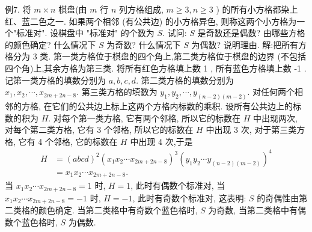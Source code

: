 例7. 将 $m \times n$ 棋盘(由 $m$ 行 $n$ 列方格组成, $m \geqslant 3, n \geqslant 3$ ) 的所有小方格都染上红、蓝二色之一.
如果两个相邻 (有公共边) 的小方格异色, 则称这两个小方格为一个"标准对". 设棋盘中 "标准对" 的个数为 $S$. 试问: $S$ 是奇数还是偶数? 由哪些方格的颜色确定? 什么情况下 $S$ 为奇数? 什么情况下 $S$ 为偶数? 说明理由.
解:把所有方格分为 3 类.
第一类方格位于棋盘的四个角上,第二类方格位于棋盘的边界 (不包括四个角)上,其余方格为第三类.
将所有红色方格填上数 1 , 所有蓝色方格填上数 -1 . 记第一类方格的填数分别为 $a, b, c, d$. 第二类方格的填数分别为 $x_1, x_2, \cdots, x_{2 m+2 n-8}$. 第三类方格的填数为 $y_1, y_2, \cdots, y_{(n-2)(m-2)}$. 对任何两个相邻的方格, 在它们的公共边上标上这两个方格内标数的乘积.
设所有公共边上的标数的积为 $H$.
对每个第一类方格, 它有两个邻格, 所以它的标数在 $H$ 中出现两次, 对每个第二类方格, 它有 3 个邻格, 所以它的标数在 $H$ 中出现 3 次, 对于第三类方格, 它有 4 个邻格, 它的标数在 $H$ 中出现 4 次,于是
$$
\begin{aligned}
H & =(a b c d)^2\left(x_1 x_2 \cdots x_{2 m+2 n-8}\right)^3\left(y_1 y_2 \cdots y_{(n-2)(m-2)}\right)^4 \\
& =x_1 x_2 \cdots x_{2 m+2 n-8} .
\end{aligned}
$$
当 $x_1 x_2 \cdots x_{2 m+2 n-8}=1$ 时, $H=1$, 此时有偶数个标准对, 当 $x_1 x_2 \cdots x_{2 m+2 n-8}=-1$ 时, $H=-1$, 此时有奇数个标准对, 这表明: $S$ 的奇偶性由第二类格的颜色确定.
当第二类格中有奇数个蓝色格时, $S$ 为奇数, 当第二类格中有偶数个蓝色格时, $S$ 为偶数.


